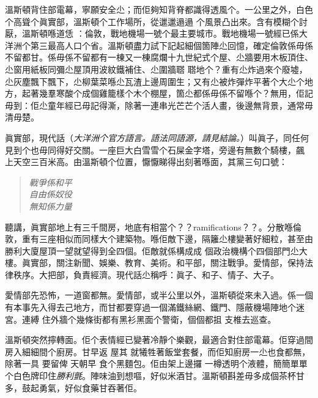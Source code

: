 溫斯頓背住部電幕，寧願安全尐；而佢夠知背脊都識得透風个。一公里之外，白色个高聳个眞實部，溫斯頓个工作場所，從邋邋遢遢
%
个風景凸出來。含有模糊个討厭，溫斯頓喺道恁
%
：倫敦，戰地機場一號个最主要城市。戰地機場一號經已係大洋洲个第三最高人口个省。溫斯頓盡力試下記起細個箇陣尐回憶，確定倫敦係毋係不留都甘。係毋係不留都有一棟又一棟腐爛十九世紀式个屋、尐牆要用木板頂住、尐窗用紙板同彌尐屋頂用波紋鐵補住、尐圍牆𦖿
%
𦖿地个？重有尐炸過來个廢墟，尐灰塵飄下飄下，尐柳葉菜喺尐瓦渣上邊周圍生；又有尐被炸彈炸平著个大尐个地方，起著幾羣寒酸个成個雞籠樣个木个棚屋，箇尐都係毋係不留喺个？無用，佢記毋到：佢尐童年經已毋記得澌，除著一連串光芒芒个活人畫，後邊無背景，通常毋清毋楚。

眞實部，現代話（\emph{大洋洲个官方語言。語法同語源，請見結論。}）叫眞子，同任何見到个也毋同得好交關。一座巨大白雪雪个石屎金字塔，旁邊有無數个騎樓，飆
%
上天空三百米高。由溫斯頓个位置，懨懨睇得出刻著喺面，其黨三句口號：
\begin{quote}\emph{
戰爭係和平\\
自由係奴役\\
無知係力量
}\end{quote}%
聽講，眞實部地上有三千間房，地底有相當个？？ramifications？？。分散喺倫敦，重有三座相似而同樣大个建築物。喺佢敵下邊，隔籬尐樓變著好細粒，甚至由勝利大廈屋頂一望就望得到全四個。佢敵就係構成成
%
個政治機構个四個部門尐大樓。眞實部，關注新聞、娛樂、教育、美術。和平部，關注戰爭。愛情部，保持法律秩序。大把部，負責經濟。現代話尐稱呼：眞子、和子、情子、大子。

愛情部先恐怖，一道窗都無。愛情部，或半公里以外，溫斯頓從來未入過。係一個有本事先入得去己地方，而甘都要穿過一個滿鐵絲網、鐵門、隱蔽機場陣地个迷宮。連縛
%
住外牆个幾條街都有黑衫黑面个警衛，個個都抯
%
支椎去巡查。

溫斯頓突然擰轉面。佢个表情經已變著冷靜个樂觀，最適合對住部電幕。佢穿過間房入細細間个廚房。甘早返
%
屋其
%
就犧牲著飯堂套餐，而佢知廚房一尐也食都無，除著一具
%
要留俾
%
天朝早
%
食个黑麵包。佢由架上邊攞
%
一樽透明个液體，簡簡單單个白色牌印住\emph{勝利氈}。陣味油到想嘔，好似米酒甘。溫斯頓斟差毋多成個茶杯甘多，鼓起勇氣，好似食藥甘吞著佢。

